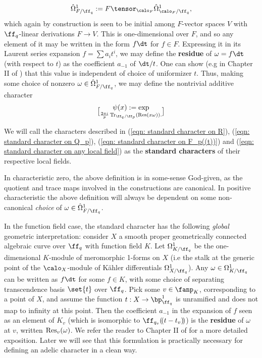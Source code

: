 \documentclass[11pt, x11names, openany]{book}
\begin{document}
\begin{itemize}
    \begin{equation*}
       \hat{\Omega}^1_{F/\ff_q} := F \tensor_{\calo_F} \hat{\Omega}^1_{\calo_F/\ff_q},
    \end{equation*}
    which again by construction is seen to be initial among $F$-vector spaces $V$ with $\ff_q$-linear derivations $F \to V$. This is one-dimensional over $F$, and so any element of it may be written in the form $f \dt$ for $f \in F$. Expressing it in its Laurent series expansion $f = \sum a_i t^i$, we may define the \textbf{residue} of $\omega = f \dt$ (with respect to $t$) as the coefficient $a_{-1}$ of $\dt/t$. One can show (e.g in Chapter II of \cite{serre2012algebraic}) that this value is independent of choice of uniformizer $t$. Thus, making some choice of nonzero $\omega \in \hat{\Omega}^1_{F/\ff_q}$, we may define the nontrivial additive character
    \begin{equation}
        \label{eqn: standard character on F_p((t))}
        \psi(x) := \exp \brack{\frac{2 \pi i}{p} \tr_{\ff_q/\ff_p}(\res(x \omega))}.
    \end{equation}
\end{itemize}

\begin{defn}
    \label{def: standard character}
We will call the characters described in (\ref{eqn: standard character on R}), (\ref{eqn: standard character on Q_p}), (\ref{eqn: standard character on F_p((t))}) and (\ref{eqn: standard character on any local field}) as the \textbf{standard characters} of their respective local fields.
\end{defn}

\begin{warning}
In characteristic zero, the above definition is in some-sense God-given, as the quotient and trace maps involved in the constructions are canonical. In positive characteristic the above definition will always be dependent on some non-canonical \textit{choice} of $\omega \in \hat{\Omega}^1_{F/\ff_q}$.
\end{warning}

In the function field case, the standard character has the following \textit{global} geometric interpretation: consider $X$ a smooth proper geometrically connected algebraic curve over $\ff_q$ with function field $K$. Let $\Omega^1_{K/\ff_q}$ be the one-dimensional $K$-module of meromorphic 1-forms on $X$ (i.e the stalk at the generic point of the $\calo_X$-module of K\"ahler differentials $\Omega^1_{X/\ff_q}$). Any $\omega \in \Omega^1_{K/\ff_q}$ can be written as $f \dt$ for some $f \in K$, with some choice of separating transcendence basis $\set{t}$ over $\ff_q$. Pick some $v \in \fanp_K$, corresponding to a point of $X$, and assume the function $t: X \to \bp^1_{\ff_q}$ is unramified and does not map to infinity at this point. Then the coefficient $a_{-1}$ in the expansion of $f$ seen as an element of $K_v$ (which is isomorphic to $ \ff_{q_v}(\!(t - t_v)\!)$) is the \textbf{residue} of $\omega$ at $v$, written $\operatorname{Res}_v(\omega)$. We refer the reader to Chapter II of \cite{serre2012algebraic} for a more detailed exposition. Later we will see that this formulation is practically necessary for defining an adelic character in a clean way. 
\end{document}
